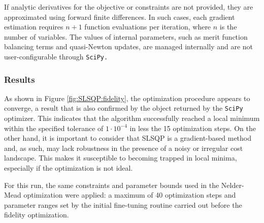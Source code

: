 If analytic derivatives for the objective or constraints are not provided, they are approximated using forward finite differences. 
In such cases, each gradient estimation requires $n+1$ function evaluations per iteration, where $n$ is the number of variables.
The values of internal parameters, such as merit function balancing terms and quasi-Newton updates, are managed internally and are not user-configurable through \tt{SciPy}.

\subsubsection{Results}
As shown in Figure \ref{fig:SLSQP:fidelity}, the optimization procedure appears to converge, a result that is also confirmed by the object returned by the \texttt{SciPy} optimizer.
This indicates that the algorithm successfully reached a local minimum within the specified tolerance of $1\cdot10^{-4}$ in less the 15 optimization steps. On the other hand, it is important to consider that SLSQP is a gradient-based method and, as such, may lack robustness in the presence of a noisy or irregular cost landscape.
This makes it susceptible to becoming trapped in local minima, especially if the optimization is not ideal.

For this run, the same constraints and parameter bounds used in the Nelder-Mead optimization were applied: a maximum of 40 optimization steps and parameter ranges set by the initial fine-tuning routine carried out before the fidelity optimization.

